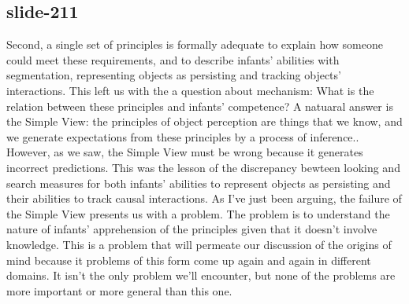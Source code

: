 \documentclass[12pt,\papersize]{extarticle}
\begin{document}
\subsection{slide-211}
Second, a single set of principles is formally adequate to explain how someone could meet these requirements, and to describe infants' abilities with segmentation, representing objects as persisting and tracking objects' interactions.
This left us with the a question about mechanism: What is the relation between these principles and infants' competence? A natuaral answer is the Simple View: the principles of object perception are things that we know, and we generate expectations from these principles by a process of inference..
However, as we saw, the Simple View must be wrong because it generates incorrect predictions. This was the lesson of the discrepancy bewteen looking and search measures for both infants' abilities to represent objects as persisting and their abilities to track causal interactions.
As I've just been arguing, the failure of the Simple View presents us with a problem. The problem is to understand the nature of infants' apprehension of the principles given that it doesn't involve knowledge. This is a problem that will permeate our discussion of the origins of mind because it problems of this form come up again and again in different domains. It isn't the only problem we'll encounter, but none of the problems are more important or more general than this one.


 






\end{document}
